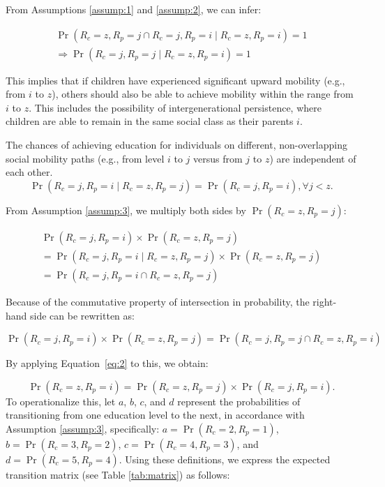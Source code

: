 From Assumptions \ref{assump:1} and \ref{assump:2}, we can infer:

\begin{equation} \label{eq:2}
\begin{array}{l}
\operatorname{Pr}(R_c = z, R_p = j \cap R_c = j, R_p = i \mid R_c = z, R_p = i) = 1 \\
\Rightarrow \operatorname{Pr}(R_c = j, R_p = j \mid R_c = z, R_p = i) = 1
\end{array}
\end{equation}

This implies that if children have experienced significant upward mobility (e.g., from \( i \) to \( z \)), others should also be able to achieve mobility within the range from \( i \) to \( z \). This includes the possibility of intergenerational persistence, where children are able to remain in the same social class as their parents \( i \).

\begin{assumption} \label{assump:3}
The chances of achieving education for individuals on different, non-overlapping social mobility paths (e.g., from level \( i \) to \( j \) versus from \( j \) to \( z \)) are independent of each other.
\[
\operatorname{Pr}(R_c = j, R_p = i \mid R_c = z, R_p = j) = \operatorname{Pr}(R_c = j, R_p = i), \forall j < z.
\]
\end{assumption}

From Assumption \ref{assump:3}, we multiply both sides by \( \operatorname{Pr}(R_c = z, R_p = j) \):

\[
\begin{array}{l}
\operatorname{Pr}(R_c = j, R_p = i) \times \operatorname{Pr}(R_c = z, R_p = j) \\
= \operatorname{Pr}(R_c = j, R_p = i \mid R_c = z, R_p = j) \times \operatorname{Pr}(R_c = z, R_p = j) \\
= \operatorname{Pr}(R_c = j, R_p = i \cap R_c = z, R_p = j)
\end{array}
\]

Because of the commutative property of intersection in probability, the right-hand side can be rewritten as:

\[
\operatorname{Pr}(R_c = j, R_p = i) \times \operatorname{Pr}(R_c = z, R_p = j) = \operatorname{Pr}(R_c = j, R_p = j \cap R_c = z, R_p = i)
\]

By applying Equation~\eqref{eq:2} to this, we obtain:

\[
\operatorname{Pr}(R_c = z, R_p = i) = \operatorname{Pr}(R_c = z, R_p = j) \times \operatorname{Pr}(R_c = j, R_p = i).
\]
To operationalize this, let \( a \), \( b \), \( c \), and \( d \) represent the probabilities of transitioning from one education level to the next, in accordance with Assumption \ref{assump:3}, specifically: \( a = \operatorname{Pr}(R_c = 2, R_p = 1) \), \( b = \operatorname{Pr}(R_c = 3, R_p = 2) \), \( c = \operatorname{Pr}(R_c = 4, R_p = 3) \), and \( d = \operatorname{Pr}(R_c = 5, R_p = 4) \). Using these definitions, we express the expected transition matrix (see Table \ref{tab:matrix}) as follows:

